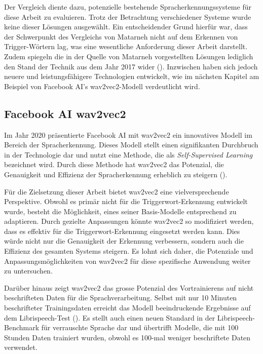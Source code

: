 \documentclass[11pt,a4paper]{article}
\begin{document}
\noindent
Der Vergleich diente dazu, potenzielle bestehende Spracherkennungssysteme für diese Arbeit zu evaluieren. Trotz der Betrachtung verschiedener Systeme wurde keine dieser Lösungen ausgewählt. Ein entscheidender Grund hierfür war, dass der Schwerpunkt des Vergleichs von Matarneh nicht auf dem Erkennen von Trigger-Wörtern lag, was eine wesentliche Anforderung dieser Arbeit darstellt. Zudem spiegeln die in der Quelle von Matarneh vorgestellten Lösungen lediglich den Stand der Technik aus dem Jahr 2017 wider (\cite{matarneh2017speechrecognition}). Inzwischen haben sich jedoch neuere und leistungsfähigere Technologien entwickelt, wie im nächsten Kapitel am Beispiel von Facebook AI's wav2vec2-Modell verdeutlicht wird.

\subsection{Facebook AI wav2vec2}
Im Jahr 2020 präsentierte Facebook AI mit wav2vec2 ein innovatives Modell im Bereich der 
Spracherkennung. Dieses Modell stellt einen signifikanten Durchbruch in der Technologie dar und 
nutzt eine Methode, die als \textit{Self-Supervised Learning} bezeichnet wird. Durch diese Methode 
hat wav2vec2 das Potenzial, die Genauigkeit und Effizienz der Spracherkennung erheblich zu steigern 
(\cite{baevski2020wav2vec}).

\noindent \newline
Für die Zielsetzung dieser Arbeit bietet wav2vec2 eine vielversprechende Perspektive. Obwohl es 
primär nicht für die Triggerwort-Erkennung entwickelt wurde, besteht die Möglichkeit, eines seiner 
Basis-Modelle entsprechend zu adaptieren. Durch gezielte Anpassungen könnte wav2vec2 so modifiziert 
werden, dass es effektiv für die Triggerwort-Erkennung eingesetzt werden kann. Dies würde nicht nur 
die Genauigkeit der Erkennung verbessern, sondern auch die Effizienz des gesamten Systems steigern. 
Es lohnt sich daher, die Potenziale und Anpassungsmöglichkeiten von wav2vec2 für diese spezifische 
Anwendung weiter zu untersuchen.

\noindent \newline
Darüber hinaus zeigt wav2vec2 das grosse Potenzial des Vortrainierens auf nicht beschrifteten 
Daten für die Sprachverarbeitung. Selbst mit nur 10 Minuten beschrifteter Trainingsdaten erreicht 
das Modell beeindruckende Ergebnisse auf dem Librispeech-Test (\cite{baevski2020wav2vec}). Es stellt 
auch einen neuen Standard in der Librispeech-Benchmark für verrauschte Sprache dar und übertrifft 
Modelle, die mit 100 Stunden Daten trainiert wurden, obwohl es 100-mal weniger beschriftete Daten 
verwendet.
\end{document}
